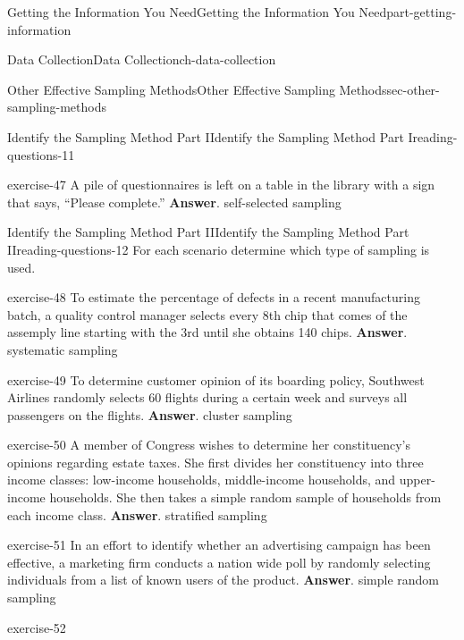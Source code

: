 \documentclass[oneside,10pt,]{book}
\numberwithin{equation}{section}
\begin{document}
\begin{partptx}{Getting the Information You Need}{}{Getting the Information You Need}{}{}{part-getting-information}
\begin{chapterptx}{Data Collection}{}{Data Collection}{}{}{ch-data-collection}
\begin{sectionptx}{Other Effective Sampling Methods}{}{Other Effective Sampling Methods}{}{}{sec-other-sampling-methods}
\begin{reading-questions-subsection-numberless}{Identify the Sampling Method Part I}{}{Identify the Sampling Method Part I}{}{}{reading-questions-11}
\begin{divisionexercise}{7}{}{}{exercise-47}
A pile of questionnaires is left on a table in the library with a sign that says, “Please complete.” \textbf{Answer}.\hypertarget{answer-48}{}\quad%
self-selected sampling\end{divisionexercise}%
\end{reading-questions-subsection-numberless}
%
%
\typeout{************************************************}
\typeout{************************************************}
%
\begin{reading-questions-subsection-numberless}{Identify the Sampling Method Part II}{}{Identify the Sampling Method Part II}{}{}{reading-questions-12}
\hypertarget{p-30}{}%
For each scenario determine which type of sampling is used.%
\begin{divisionexercise}{1}{}{}{exercise-48}%
To estimate the percentage of defects in a recent manufacturing batch, a quality control manager selects every 8th chip that comes of the assemply line starting with the 3rd until she obtains 140 chips. \textbf{Answer}.\hypertarget{answer-49}{}\quad%
systematic sampling\end{divisionexercise}%
\begin{divisionexercise}{2}{}{}{exercise-49}%
To determine customer opinion of its boarding policy, Southwest Airlines randomly selects 60 flights during a certain week and surveys all passengers on the flights. \textbf{Answer}.\hypertarget{answer-50}{}\quad%
cluster sampling\end{divisionexercise}%
\begin{divisionexercise}{3}{}{}{exercise-50}%
A member of Congress wishes to determine her constituency’s opinions regarding estate taxes. She first divides her constituency into three income classes: low-income households, middle-income households, and upper-income households. She then takes a simple random sample of households from each income class. \textbf{Answer}.\hypertarget{answer-51}{}\quad%
stratified sampling\end{divisionexercise}%
\begin{divisionexercise}{4}{}{}{exercise-51}%
In an effort to identify whether an advertising campaign has been effective, a marketing firm conducts a nation wide poll by randomly selecting individuals from a list of known users of the product. \textbf{Answer}.\hypertarget{answer-52}{}\quad%
simple random sampling\end{divisionexercise}%
\begin{divisionexercise}{5}{}{}{exercise-52}%

\end{divisionexercise}
\end{reading-questions-subsection-numberless}
\end{sectionptx}
\end{chapterptx}
\end{partptx}
\end{document}
